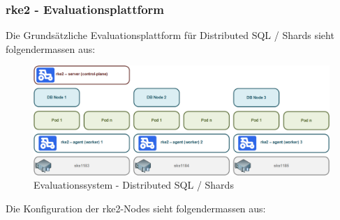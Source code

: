
\begin{flushleft}
    \subsubsection{rke2 - Evaluationsplattform}
    Die Grundsätzliche Evaluationsplattform für Distributed SQL / Shards sieht folgendermassen aus:
    \begin{figure}[H]
        \centering
        \includegraphics[width=0.8\linewidth]{source/implementation/evaluation/platforms/evaluation_enviroment_rke2}
        \caption{Evaluationssystem - Distributed SQL / Shards}
        \label{fig:evaluation_enviroment_rke2}
    \end{figure}
    
    Die Konfiguration der rke2-Nodes sieht folgendermassen aus:
    
    
\end{flushleft}